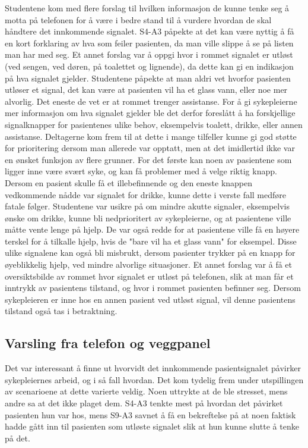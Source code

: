 \noindent
Studentene kom med flere forslag til hvilken informasjon de kunne tenke seg å motta på telefonen for å være i bedre stand til å vurdere hvordan de skal håndtere det innkommende signalet. S4-A3 påpekte at det kan være nyttig å få en kort forklaring av hva som feiler pasienten, da man ville slippe å se på listen man har med seg. Et annet forslag var å oppgi hvor i rommet signalet er utløst (ved sengen, ved døren, på toalettet og lignende), da dette kan gi en indikasjon på hva signalet gjelder. Studentene påpekte at man aldri vet hvorfor pasienten utløser et signal, det kan være at pasienten vil ha et glass vann, eller noe mer alvorlig. Det eneste de vet er at rommet trenger assistanse. For å gi sykepleierne mer informasjon om hva signalet gjelder ble det derfor foreslått å ha forskjellige signalknapper for pasientenes ulike behov, eksempelvis toalett, drikke, eller annen assistanse. Deltagerne kom  frem til at dette i mange tilfeller kunne gi god støtte for prioritering dersom man allerede var opptatt, men at det imidlertid ikke var en ønsket funksjon av flere grunner. For det første kan noen av pasientene som ligger inne være svært syke, og kan få problemer med å velge riktig knapp. Dersom en pasient skulle få et illebefinnende og den eneste knappen vedkommende nådde var signalet for drikke, kunne dette i verste fall medføre fatale følger. Studentene var usikre på om mindre akutte signaler, eksempelvis ønske om drikke, kunne bli nedprioritert av sykepleierne, og at pasientene ville måtte vente lenge på hjelp. De var også redde for at pasientene ville få en høyere terskel for å tilkalle hjelp, hvis de "bare vil ha et glass vann" for eksempel. Disse ulike signalene kan også bli misbrukt, dersom pasienter trykker på en knapp for øyeblikkelig hjelp, ved mindre alvorlige situasjoner. Et annet forslag var å få et oversiktsbilde av rommet hvor signalet er utløst på telefonen, slik at man får et inntrykk av pasientens tilstand, og hvor i rommet pasienten befinner seg. Dersom sykepleieren er inne hos en annen pasient ved utløst signal, vil denne pasientens tilstand også tas i betraktning. 

\subsection{Varsling fra telefon og veggpanel}
Det var interessant å finne ut hvorvidt det innkommende pasientsignalet påvirker sykepleiernes arbeid, og i så fall hvordan. Det kom tydelig frem under utspillingen av scenarioene at dette varierte veldig. Noen uttrykte at de ble stresset, mens andre sa at det ikke plaget dem. S4-A3 tenkte mest på hvordan det påvirket pasienten hun var hos, mens S9-A3 savnet å få en bekreftelse på at noen faktisk hadde gått inn til pasienten som utløste signalet slik at hun kunne slutte å tenke på det. 

